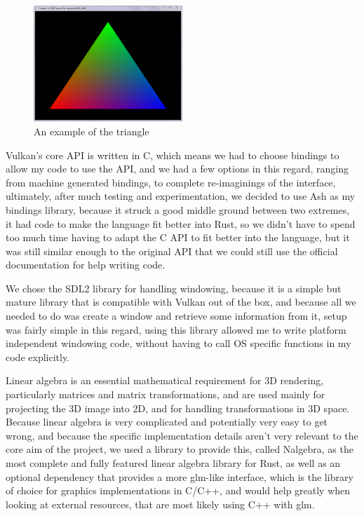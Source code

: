 \documentclass[../report.tex]{subfiles}
\begin{document}
\begin{figure}[h]
    \centering
    \includegraphics[width=0.5\textwidth]{images/triangle.png}
    \caption{An example of the triangle}
\end{figure}

Vulkan's core API is written in C, which means we had to choose bindings to allow my code to use the API, and we had a few options in this regard, ranging from machine generated bindings, to complete re-imaginings of the interface, ultimately, after much testing and experimentation, we decided to use Ash as my bindings library, because it struck a good middle ground between two extremes, it had code to make the language fit better into Rust, so we didn't have to spend too much time having to adapt the C API to fit better into the language, but it was still similar enough to the original API that we could still use the official documentation for help writing code.

We chose the SDL2 library for handling windowing, because it is a simple but mature library that is compatible with Vulkan out of the box, and because all we needed to do was create a window and retrieve some information from it, setup was fairly simple in this regard, using this library allowed me to write platform independent windowing code, without having to call OS specific functions in my code explicitly.

Linear algebra is an essential mathematical requirement for 3D rendering, particularly matrices and matrix transformations, and are used mainly for projecting the 3D image into 2D, and for handling transformations in 3D space. Because linear algebra is very complicated and potentially very easy to get wrong, and because the specific implementation details aren't very relevant to the core aim of the project, we used a library to provide this, called Nalgebra, as the most complete and fully featured linear algebra library for Rust, as well as an optional dependency that provides a more glm-like interface, which is the library of choice for graphics implementations in C/C++, and would help greatly when looking at external resources, that are most likely using C++ with glm.
\end{document}
